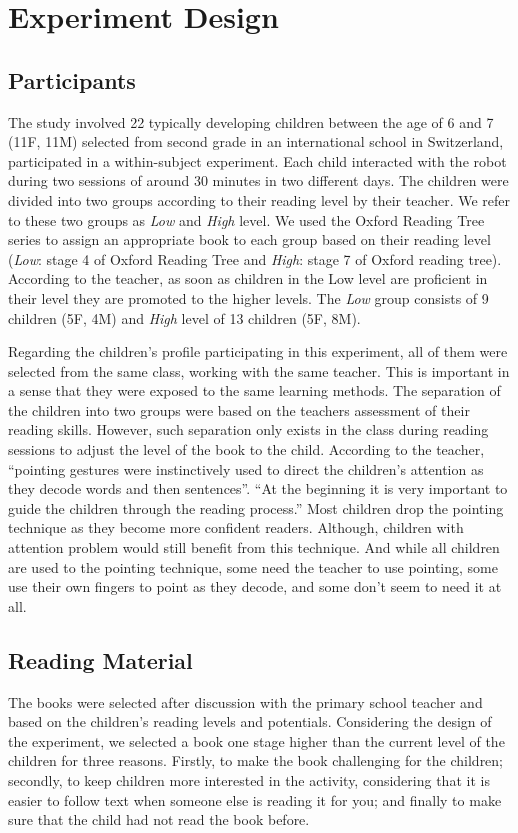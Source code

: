 \documentclass{sigchi}
\begin{document}
\section{Experiment Design}
\subsection{Participants}
The study involved 22 typically developing children between the age of 6 and 7 (11F, 11M) selected from second grade in an international school in Switzerland, participated in a within-subject experiment. Each child interacted with the robot during two sessions of around 30 minutes in two different days. 
The children were divided into two groups according to their reading level by their teacher. We refer to these two groups as \textit{Low} and \textit{High} level. 
We used the Oxford Reading Tree series to assign an appropriate book to each group based on their reading level (\textit{Low}: stage 4 of Oxford Reading Tree and \textit{High}: stage 7 of Oxford reading tree). 
According to the teacher, as soon as children in the Low level are proficient in their level they are promoted to the higher levels.
The \textit{Low} group consists of 9 children (5F, 4M) and \textit{High} level of 13 children (5F, 8M).

Regarding the children's profile participating in this experiment, all of them were selected from the same class, working with the same teacher. 
This is important in a sense that they were exposed to the same learning methods.
The separation of the children into two groups were based on the teachers assessment of their reading skills. 
However, such separation only exists in the class during reading sessions to adjust the level of the book to the child.
According to the teacher, ``pointing gestures were instinctively used to direct the children’s attention as they decode words and then sentences''.
``At the beginning it is very important to guide the children through the reading process.''
Most children drop the pointing technique as they become more confident readers. 
Although, children with attention problem would still benefit from this technique. 
And while all children are used to the pointing technique, some need the teacher to use pointing, some use their own fingers to point as they decode, and some don't seem to need it at all.


\subsection{Reading Material}
The books were selected after discussion with the primary school teacher and based on the children's reading levels and potentials.
Considering the design of the experiment, we selected a book one stage higher than the current level of the children for three reasons.
Firstly, to make the book challenging for the children; 
secondly, to keep children more interested in the activity, considering that it is easier to follow text when someone else is reading it for you; and finally
to make sure that the child had not read the book before. 
\end{document}
